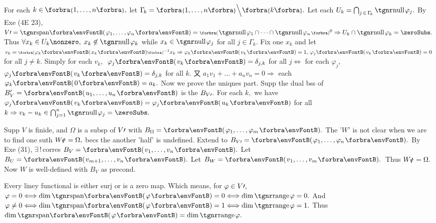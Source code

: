 For each $k\in\;\!\!\Bra{1,\dots,n},$ let $\Gamma_{\!k}=\Bra{1,\dots,n}\Backslash[\Big]\Bra{k}.$ Let each $U_k=\bigcap_{j\,\in\,\Gamma_{\!k}}\null\varphi_j.$\parSol{}
By Exe (4E 23), $V\apostrophe=\Span{\varphi_1,\dots,\varphi_n}=\BigPar{\null\varphi_1\cap\cdots\cap\null\varphi_n}{^0}\Rightarrow U_k\cap\null\varphi_k=\zeroSubs.$\parSol{}
Thus $\forall x_k\in U_k\nonzero,\;x_k\not\in\null\varphi_k$ while $x_k\in\null\varphi_j$ for all $j\in\Gamma_{\!k}.$\parSol{}
Fix one $x_k$ and let $v_k=\Sbra{\varphi_k\Par{x_k}}{^{-1}}x_k\Rightarrow\varphi_k\Par{v_k}=1,\,\varphi_j\Par{v_k}=0$ for all $j\neq k.$\parSol{}
Simply for each $v_k,$ \,$\varphi_j\Par{v_k}=\delta_{j,k}$ for all $j\Longleftrightarrow$ for each $\varphi_j,$ $\varphi_j\Par{v_k}=\delta_{j,k}$ for all $k.$\parSol{}
又 $a_1v_1+\dots+a_nv_n=0\Rightarrow$ each $\varphi_k\Par{0}=a_k.$\vspace{2pt}\parSol{}
Now we prove the uniqnes part. Supp the dual bss of $B_V'=\Par{u_1,\dots,u_n}$ is the $B_{V\prime}.$\parSol{}
For each $k,$ we have $\varphi_j\Par{v_k}=\varphi_j\Par{u_k}$ for all $k\Rightarrow v_k-u_k\in\bigcap_{j=1}^n\null\varphi_j=\zeroSubs.$\PfEnd
\SepLine

\BulletPointX{}\;\;Supp $V$ is finide, and $\Omega$ is a subsp of $V\prime$ with $B_{\Omega}=\Par{\varphi_1,\dots,\varphi_m}.$\TextB{}
The '$W$' is not clear when we are to find one suth $W_V\!\!\!\prime\,=\Omega,$ becs the another 'half' is undefined.\TextB{}
Extend to $B_{V\apostrophe}=\Par{\varphi_1,\dots,\varphi_n}.$ By Exe (31), $\exists\,!\,$corres $B_V=\Par{v_1,\dots,v_n}.$ Let $B_U=\Par{v_{m+1},\dots,v_n}.$\TextB{}
Let $B_W=\Par{v_1,\dots,v_m}.$ \,Thus $W_V\!\!\!\prime\,=\Omega.$ Now $W$ is well-defined with $B_V$ as precond.
\SepLine

\BulletPointX{}\;\;Every liney functional is either surj or is a zero map.\TextB{}
Which means, for $\varphi\in V\prime,$ $\varphi=0\Longleftrightarrow\dim\Span{\varphi}=0\Longleftrightarrow\dim\range\varphi=0.$\TextB{}
And $\varphi\neq 0\Longleftrightarrow\dim\Span{\varphi}=1\Longleftrightarrow\dim\range\varphi=1.$ Thus $\dim\Span{\varphi}=\dim\range\varphi.$\vspace{-2pt}
\SepLine


